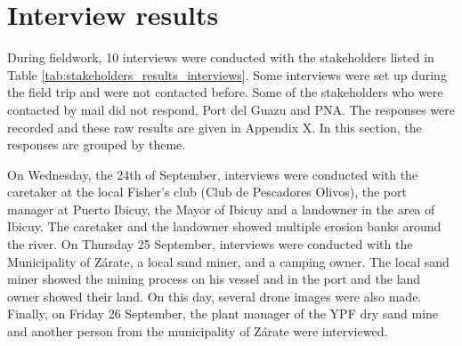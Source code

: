 \section{Interview results}
\label{sect:interviewresults}

During fieldwork, 10 interviews were conducted with the stakeholders listed in Table \ref{tab:stakeholders_results_interviews}. Some interviews were set up during the field trip and were not contacted before. Some of the stakeholders who were contacted by mail did not respond, Port del Guazu and PNA. The responses were recorded and these raw results are given in Appendix X. In this section, the responses are grouped by theme.

On Wednesday, the 24th of September, interviews were conducted with the caretaker at the local Fisher's club (Club de Pescadores Olivos), the port manager at Puerto Ibicuy, the Mayor of Ibicuy and a landowner in the area of Ibicuy. The caretaker and the landowner showed multiple erosion banks around the river. On Thursday 25 September, interviews were conducted with the Municipality of Zárate, a local sand miner, and a camping owner. The local sand miner showed the mining process on his vessel and in the port and the land owner showed their land. On this day, several drone images were also made. Finally, on Friday 26 September, the plant manager of the YPF dry sand mine and another person from the municipality of Zárate were interviewed. 

